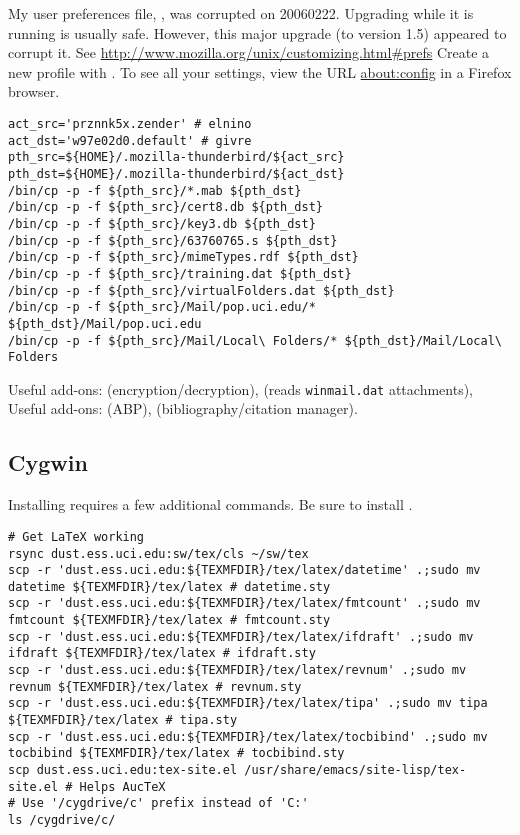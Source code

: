\documentclass[12pt,twoside]{article}
\begin{document}
My user preferences file, , was corrupted on 20060222.
Upgrading  while it is running is usually safe.
However, this major upgrade (to version 1.5) appeared to corrupt it.
See \url{http://www.mozilla.org/unix/customizing.html#prefs}
Create a new profile with .
To see all your  settings, view the URL
\url{about:config} in a Firefox browser.
\begin{verbatim}
act_src='prznnk5x.zender' # elnino
act_dst='w97e02d0.default' # givre
pth_src=${HOME}/.mozilla-thunderbird/${act_src}
pth_dst=${HOME}/.mozilla-thunderbird/${act_dst}
/bin/cp -p -f ${pth_src}/*.mab ${pth_dst}
/bin/cp -p -f ${pth_src}/cert8.db ${pth_dst}
/bin/cp -p -f ${pth_src}/key3.db ${pth_dst}
/bin/cp -p -f ${pth_src}/63760765.s ${pth_dst}
/bin/cp -p -f ${pth_src}/mimeTypes.rdf ${pth_dst}
/bin/cp -p -f ${pth_src}/training.dat ${pth_dst}
/bin/cp -p -f ${pth_src}/virtualFolders.dat ${pth_dst}
/bin/cp -p -f ${pth_src}/Mail/pop.uci.edu/* ${pth_dst}/Mail/pop.uci.edu
/bin/cp -p -f ${pth_src}/Mail/Local\ Folders/* ${pth_dst}/Mail/Local\ Folders
\end{verbatim}

Useful  add-ons:
 (encryption/decryption), 
 (reads \texttt{winmail.dat} attachments),
Useful  add-ons:
 (ABP), 
 (bibliography/citation manager).

\subsection{Cygwin}
Installing  requires a few additional commands.
Be sure to install .
\begin{verbatim}
# Get LaTeX working
rsync dust.ess.uci.edu:sw/tex/cls ~/sw/tex
scp -r 'dust.ess.uci.edu:${TEXMFDIR}/tex/latex/datetime' .;sudo mv datetime ${TEXMFDIR}/tex/latex # datetime.sty
scp -r 'dust.ess.uci.edu:${TEXMFDIR}/tex/latex/fmtcount' .;sudo mv fmtcount ${TEXMFDIR}/tex/latex # fmtcount.sty
scp -r 'dust.ess.uci.edu:${TEXMFDIR}/tex/latex/ifdraft' .;sudo mv ifdraft ${TEXMFDIR}/tex/latex # ifdraft.sty
scp -r 'dust.ess.uci.edu:${TEXMFDIR}/tex/latex/revnum' .;sudo mv revnum ${TEXMFDIR}/tex/latex # revnum.sty
scp -r 'dust.ess.uci.edu:${TEXMFDIR}/tex/latex/tipa' .;sudo mv tipa ${TEXMFDIR}/tex/latex # tipa.sty
scp -r 'dust.ess.uci.edu:${TEXMFDIR}/tex/latex/tocbibind' .;sudo mv tocbibind ${TEXMFDIR}/tex/latex # tocbibind.sty
scp dust.ess.uci.edu:tex-site.el /usr/share/emacs/site-lisp/tex-site.el # Helps AucTeX
# Use '/cygdrive/c' prefix instead of 'C:'
ls /cygdrive/c/
\end{verbatim}
\end{document}
